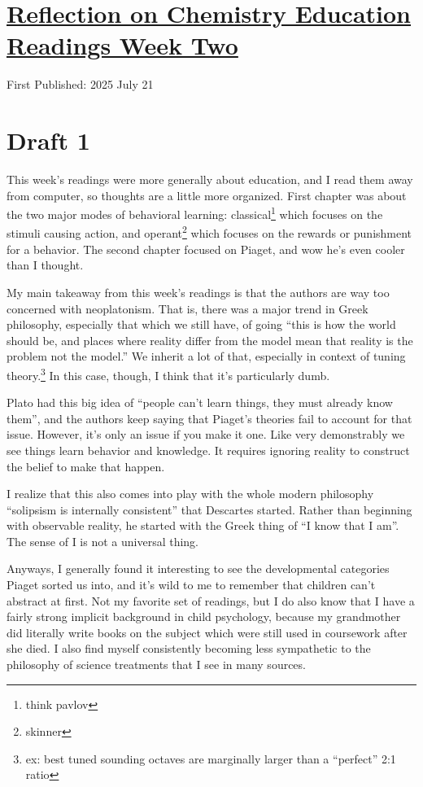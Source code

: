 \documentclass[12pt]{article}
\newcommand{\say}[1]{``#1''}
\renewcommand{\,}{\textsuperscript{,}}
\begin{document}
  
\doublespacing  
\section{\href{chemistry-education-research-2.html}{Reflection on Chemistry Education Readings Week Two}}  
First Published: 2025 July 21

\section{Draft 1}

This week's readings were more generally about education, and I read them away from computer, so thoughts are a little more organized.  
First chapter was about the two major modes of behavioral learning: classical\footnote{think pavlov} which focuses on the stimuli causing action, and operant\footnote{skinner} which focuses on the rewards or punishment for a behavior.  
The second chapter focused on Piaget, and wow he's even cooler than I thought.

My main takeaway from this week's readings is that the authors are way too concerned with neoplatonism.  
That is, there was a major trend in Greek philosophy, especially that which we still have, of going \say{this is how the world should be, and places where reality differ from the model mean that reality is the problem not the model.}  
We inherit a lot of that, especially in context of tuning theory.\footnote{ex: best tuned sounding octaves are marginally larger than a \say{perfect} 2:1 ratio}  
In this case, though, I think that it's particularly dumb.

Plato had this big idea of \say{people can't learn things, they must already know them}, and the authors keep saying that Piaget's theories fail to account for that issue.  
However, it's only an issue if you make it one.  
Like very demonstrably we see things learn behavior and knowledge.  
It requires ignoring reality to construct the belief to make that happen.

I realize that this also comes into play with the whole modern philosophy \say{solipsism is internally consistent} that Descartes started.  
Rather than beginning with observable reality, he started with the Greek thing of \say{I know that I am}.  
The sense of I is not a universal thing.

Anyways, I generally found it interesting to see the developmental categories Piaget sorted us into, and it's wild to me to remember that children can't abstract at first.  
Not my favorite set of readings, but I do also know that I have a fairly strong implicit background in child psychology, because my grandmother did literally write books on the subject which were still used in coursework after she died.  
I also find myself consistently becoming less sympathetic to the philosophy of science treatments that I see in many sources.
\end{document}

